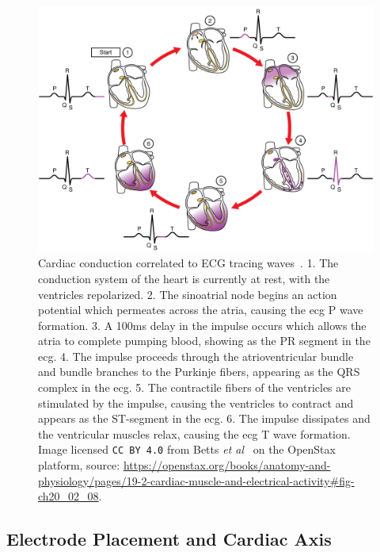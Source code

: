 \documentclass[\main/thesis.tex]{subfiles}
\begin{document}
\begin{figure}[hb]
    \centering
    \includegraphics[width=14cm]{figure/pqrst_with_heart_conduction_system.jpeg}
    \caption[Cardiac conduction correlated to ECG tracing waves.]{Cardiac conduction correlated to ECG tracing waves~\cite{betts-anatomy-and-physiology}.
    1. The conduction system of the heart is currently at rest, with the ventricles repolarized.
    2. The sinoatrial node begins an action potential which permeates across the atria, causing the \gls{ecg} P wave formation.
    3. A 100ms delay in the impulse occurs which allows the atria to complete pumping blood, showing as the PR segment in the \gls{ecg}.
    4. The impulse proceeds through the atrioventricular bundle and bundle branches to the Purkinje fibers, appearing as the QRS complex in the \gls{ecg}.
    5. The contractile fibers of the ventricles are stimulated by the impulse, causing the ventricles to contract and appears as the ST-segment in the \gls{ecg}.
    6. The impulse dissipates and the ventricular muscles relax, causing the \gls{ecg} T wave formation.
    Image licensed \texttt{CC BY 4.0} from Betts \emph{et al}~\cite{betts-anatomy-and-physiology} on the OpenStax platform, source: \url{https://openstax.org/books/anatomy-and-physiology/pages/19-2-cardiac-muscle-and-electrical-activity\#fig-ch20_02_08}.}
    \label{fig:pqrst_heart_conduction_system}
\end{figure}

\subsection{Electrode Placement and Cardiac Axis}
\end{document}

